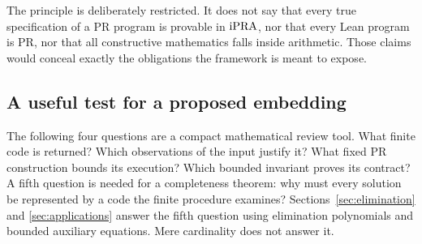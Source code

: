 The principle is deliberately restricted. It does not say that every
true specification of a PR program is provable in \(\mathrm{iPRA}\), nor that
every Lean program is PR, nor that all constructive mathematics falls
inside arithmetic. Those claims would conceal exactly the obligations
the framework is meant to expose.

\subsection{A useful test for a proposed embedding}

The following four questions are a compact mathematical review tool.
What finite code is returned? Which observations of the input justify
it? What fixed PR construction bounds its execution? Which bounded
invariant proves its contract? A fifth question is needed for a
completeness theorem: why must every solution be represented by a code
the finite procedure examines? Sections~\ref{sec:elimination} and
\ref{sec:applications} answer the fifth question using elimination
polynomials and bounded auxiliary equations. Mere cardinality does not
answer it.

